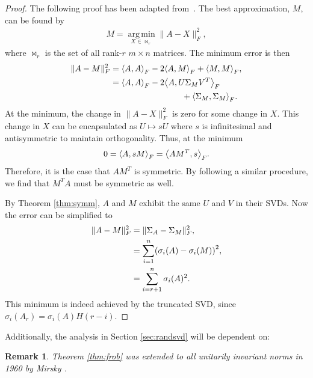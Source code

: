 \documentclass[11pt, a4paper, twocolumn]{article}
\let\originalleft\left
\let\originalright\right
\renewcommand{\left}{\mathopen{}\mathclose\bgroup\originalleft}
\renewcommand{\right}{\aftergroup\egroup\originalright}
\DeclareMathOperator{\argmin}{arg\,min}
\newtheorem{remark}{Remark}
\begin{document}
\begin{proof}
    The following proof has been adapted from~\cite{eckart}. The best approximation, $M$, can be found by
    \begin{align}
        M = \underset{X \in \bowtie_r}{\argmin} \| A - X \|_F^2,
    \end{align}
    where $\bowtie_r$ is the set of all rank-$r$ $m \times n$ matrices. The minimum error is then
    \begin{align}
        \label{eq:err}
        \nonumber \| A - M \|_F^2 &= \left< A, A \right>_F - 2 \left< A, M \right>_F + \left< M, M \right>_F, \\
        &= \left< A, A \right>_F - 2 \left< A, U \Sigma_M V^T \right>_F \\
        \nonumber & \hspace{3cm} + \left< \Sigma_M, \Sigma_M \right>_F.
    \end{align}
    At the minimum, the change in $\| A - X \|_F^2$ is zero for some change in $X$. This change in $X$ can be encapsulated as $U \mapsto sU$ where $s$ is infinitesimal and antisymmetric to maintain orthogonality. Thus, at the minimum
    \begin{align}
        0 = \left< A, s M \right>_F = \left< A M^T, s \right>_F.
    \end{align}
    Therefore, it is the case that $A M^T$ is symmetric. By following a similar procedure, we find that $M^T A$ must be symmetric as well.

    By Theorem \ref{thm:symm}, $A$ and $M$ exhibit the same $U$ and $V$ in their SVDs. Now the error can be simplified to
    \begin{align}
        \| A - M \|_F^2 &= \| \Sigma_A - \Sigma_M \|_F^2, \\
        &= \sum_{i=1}^n \left( \sigma_i(A) - \sigma_i(M) \right)^2, \\
        &= \sum_{i = r+1}^n \sigma_i(A)^2.
    \end{align}
    This minimum is indeed achieved by the truncated SVD, since $\sigma_i(A_r) = \sigma_i(A) H(r - i)$.
\end{proof}
\noindent Additionally, the analysis in Section \ref{sec:randsvd} will be dependent on:
\begin{remark}
    Theorem \ref{thm:frob} was extended to all unitarily invariant norms in 1960 by Mirsky \cite{mirsky}.
    \label{thm:unitary}
\end{remark}
\end{document}

